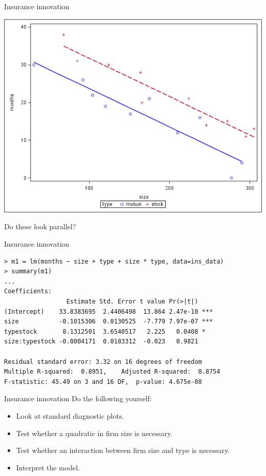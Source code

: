 \documentclass{beamer}
\begin{document}
\begin{frame}{Insurance innovation}
\centerline{\includegraphics[scale=0.25]{categ}}
Do these look parallel?
\end{frame}

\begin{frame}[fragile]{Insurance innovation}
\begin{footnotesize}
\begin{verbatim}
> m1 = lm(months ~ size + type + size * type, data=ins_data)
> summary(m1)
...
Coefficients:
                 Estimate Std. Error t value Pr(>|t|)    
(Intercept)    33.8383695  2.4406498  13.864 2.47e-10 ***
size           -0.1015306  0.0130525  -7.779 7.97e-07 ***
typestock       8.1312501  3.6540517   2.225   0.0408 *  
size:typestock -0.0004171  0.0183312  -0.023   0.9821  

Residual standard error: 3.32 on 16 degrees of freedom
Multiple R-squared:  0.8951,	Adjusted R-squared:  0.8754 
F-statistic: 45.49 on 3 and 16 DF,  p-value: 4.675e-08 
\end{verbatim}
\end{footnotesize}
\end{frame}

\begin{frame}{Insurance innovation}
Do the following yourself:
\begin{itemize}
\item Look at standard diagnostic plots.
\item Test whether a quadratic in firm size is necessary.
\item Test whether an interaction between firm size and type is
necessary.
\item Interpret the model.
\end{itemize}
\end{frame}
\end{document}
